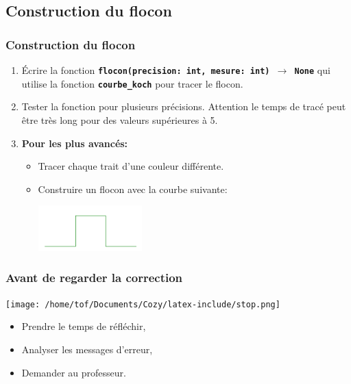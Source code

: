 \documentclass[svgnames,11pt]{beamer}
\begin{document}
\subsection{Construction du flocon}
\begin{frame}
    \frametitle{Construction du flocon}

    \begin{activite}
    \begin{enumerate}
        \item Écrire la fonction \textbf{\texttt{flocon(precision: int, mesure: int) $\rightarrow$ None}} qui utilise la fonction \textbf{\texttt{courbe\_koch}} pour tracer le flocon.
        \item Tester la fonction pour plusieurs précisions. Attention le temps de tracé peut être très long pour des valeurs supérieures à 5.
        \item \textbf{Pour les plus avancés:}
        \begin{itemize}
            \item Tracer chaque trait d'une couleur différente.
            \item Construire un flocon avec la courbe suivante:
            \begin{center}
            \centering
            \includegraphics[width=4cm]{ressources/vonkochcarre.png}
            \end{center}
        \end{itemize}
    \end{enumerate}
    \end{activite}

\end{frame}
\begin{frame}
    \frametitle{Avant de regarder la correction}
\begin{center}
    \centering
    \texttt{[image: /home/tof/Documents/Cozy/latex-include/stop.png]}
    \end{center}
{\Large
    \begin{itemize}
        \item Prendre le temps de réfléchir,
        \item Analyser les messages d'erreur,
        \item Demander au professeur.
    \end{itemize}
}
\end{frame}
\end{document}
